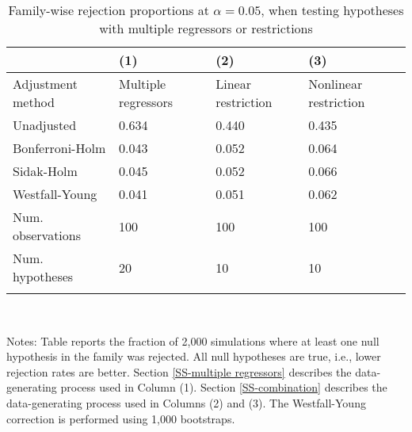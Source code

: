 \documentclass{article}
\begin{document}
\begin{table}[tbp] \centering
{}

\caption{Family-wise rejection proportions at \(\alpha = 0.05\), when testing hypotheses with multiple regressors or restrictions}
\label{tab:wyoung3}
\begin{tabularx}{\linewidth}{@{}lCCC@{}}

\toprule
&{(1)}&{(2)}&{(3)} \tabularnewline \midrule
{Adjustment method}&{Multiple regressors}&{Linear restriction}&{Nonlinear restriction} \tabularnewline
\midrule \addlinespace[\belowrulesep]
Unadjusted&0.634&0.440&0.435 \tabularnewline
Bonferroni-Holm&0.043&0.052&0.064 \tabularnewline
Sidak-Holm&0.045&0.052&0.066 \tabularnewline
Westfall-Young&0.041&0.051&0.062 \tabularnewline
\midrule Num. observations&100&100&100 \tabularnewline
Num. hypotheses&20&10&10 \tabularnewline
\bottomrule \addlinespace[\belowrulesep]

\end{tabularx}
\\ \parbox{\linewidth}{\footnotesize Notes: Table reports the fraction of 2,000 simulations where at least one null hypothesis in the family was rejected. All null hypotheses are true, i.e., lower rejection rates are better. Section \ref{SS-multiple regressors} describes the data-generating process used in Column (1). Section \ref{SS-combination} describes the data-generating process used in Columns (2) and (3). The Westfall-Young correction is performed using 1,000 bootstraps.}
\end{table}
\end{document}

